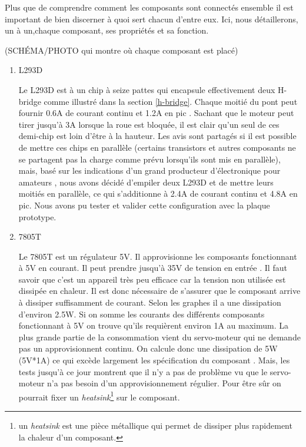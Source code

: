 \documentclass[a4paper,11pt]{report}
\begin{document}
{Plus que de comprendre comment les composants sont connectés ensemble il est important de bien discerner à quoi sert chacun d'entre eux. Ici, nous détaillerons, un à un,chaque composant, ses propriétés et sa fonction.

(SCHÉMA/PHOTO qui montre où chaque composant est placé)

\begin{enumerate}
\item L293D

Le L293D est à un chip à seize pattes qui encapsule effectivement deux H-bridge comme illustré dans la section \ref{h-bridge}. Chaque moitié du pont peut fournir 0.6A de courant continu et 1.2A en pic	 \cite{l293dDataSheet}. Sachant que le moteur peut tirer jusqu'à 3A lorsque la roue est bloquée, il est clair qu'un seul de ces demi-chip est loin d'être à la hauteur. Les avis sont partagés si il est possible de mettre ces chips en parallèle (certains transistors et autres composants ne se partagent pas la charge comme prévu lorsqu'ils sont mis en parallèle), mais, basé sur les indications d'un grand producteur d'électronique pour amateurs \cite{adafruitMotorShield}, nous avons décidé d'empiler deux L293D et de mettre leurs moitiés en parallèle, ce qui s'additionne à 2.4A de courant continu et 4.8A en pic. Nous avons pu tester et valider cette configuration avec la plaque prototype. 

\item 7805T

Le 7805T est un régulateur 5V. Il approvisionne les composants fonctionnant à 5V en courant. Il peut prendre jusqu'à 35V de tension en entrée \cite{7805T}. Il faut savoir que c'est un appareil très peu efficace car la tension non utilisée est dissipée en chaleur. Il est donc nécessaire de s'assurer que le composant arrive à dissiper suffisamment de courant. Selon les graphes il a une dissipation d'environ 2.5W. Si on somme les courants des différents composants fonctionnant à 5V on trouve qu'ils requièrent environ 1A au maximum. La plus grande partie de la consommation vient du servo-moteur qui ne demande pas un approvisionnent continu. On calcule donc une dissipation de 5W (5V*1A) ce qui excède largement les spécification du composant \cite{7805T}. Mais, les tests jusqu'à ce jour montrent que il n'y a pas de problème vu que le servo-moteur n'a pas besoin d'un approvisionnement régulier. Pour être sûr on pourrait fixer un \textit{heatsink}\footnote{un \textit{heatsink} est une pièce métallique qui permet de dissiper plus rapidement la chaleur d'un composant.} sur le composant.


\end{enumerate}}
\end{document}

